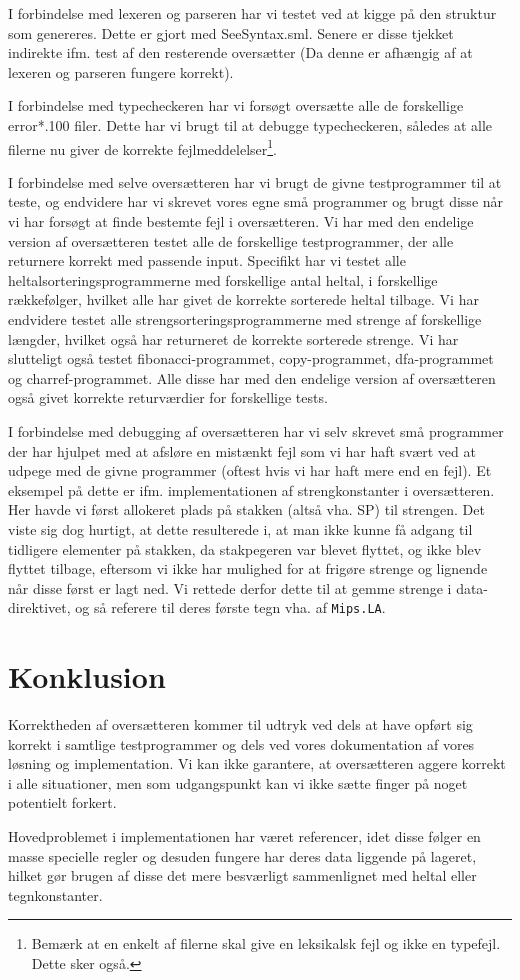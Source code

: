 \documentclass[a4paper, 10pt]{article}
\begin{document}
I forbindelse med lexeren og parseren har vi testet ved at kigge på den struktur
som genereres. Dette er gjort med SeeSyntax.sml. Senere er disse tjekket indirekte
ifm. test af den resterende oversætter (Da denne er afhængig af at lexeren og
parseren fungere korrekt).

I forbindelse med typecheckeren har vi forsøgt oversætte alle de forskellige 
error*.100 filer. Dette har vi brugt til at debugge typecheckeren, således at alle
filerne nu giver de korrekte fejlmeddelelser\footnote{Bemærk at en enkelt af 
filerne skal give en leksikalsk fejl og ikke en typefejl. Dette sker også.}.

I forbindelse med selve oversætteren har vi brugt de givne testprogrammer til
at teste, og endvidere har vi skrevet vores egne små programmer og brugt disse 
når vi har forsøgt at finde bestemte fejl i oversætteren. Vi har med den endelige
version af oversætteren testet alle de forskellige testprogrammer, der alle 
returnere korrekt med passende input. Specifikt har vi testet alle 
heltalsorteringsprogrammerne med forskellige antal heltal, i forskellige 
rækkefølger, hvilket alle har givet de korrekte sorterede heltal tilbage. 
Vi har endvidere testet alle strengsorteringsprogrammerne med strenge af 
forskellige længder, hvilket også har returneret de korrekte sorterede strenge.
Vi har slutteligt også testet fibonacci-programmet, copy-programmet, 
dfa-programmet og charref-programmet. Alle disse har med den endelige version af
oversætteren også givet korrekte returværdier for forskellige tests.

I forbindelse med debugging af oversætteren har vi selv skrevet små programmer 
der har hjulpet med at afsløre en mistænkt fejl som vi har haft svært ved at
udpege med de givne programmer (oftest hvis vi har haft mere end en fejl). Et 
eksempel på dette er ifm. implementationen af strengkonstanter i oversætteren. 
Her havde vi først allokeret plads på stakken (altså vha. SP) til strengen. Det 
viste sig dog hurtigt, at dette resulterede i, at man ikke kunne få adgang til
tidligere elementer på stakken, da stakpegeren var blevet flyttet, og ikke blev 
flyttet tilbage, eftersom vi ikke har mulighed for at frigøre strenge og 
lignende når disse først er lagt ned. Vi rettede derfor dette til at gemme 
strenge i data-direktivet, og så referere til deres første tegn vha. af 
\texttt{Mips.LA}.


\section{Konklusion}
Korrektheden af oversætteren kommer til udtryk ved dels at have opført sig korrekt i samtlige testprogrammer og dels ved vores dokumentation af vores løsning og implementation. Vi kan ikke garantere, at oversætteren aggere korrekt i alle situationer, men som udgangspunkt kan vi ikke sætte finger på noget potentielt forkert.

Hovedproblemet i implementationen har været referencer, idet disse følger en masse specielle regler og desuden fungere har deres data liggende på lageret, hilket gør brugen af disse det mere besværligt sammenlignet med heltal eller tegnkonstanter.

\end{document}

